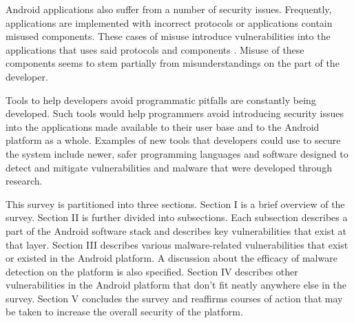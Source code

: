 Android applications also suffer from a number of security issues.
Frequently, applications are implemented with incorrect protocols or applications contain misused components.
These cases of misuse introduce vulnerabilities into the applications that uses said protocols and components \cite{Qin2020, Zhan2021, Maalouf2021}.
Misuse of these components seems to stem partially from misunderstandings on the part of the developer.

Tools to help developers avoid programmatic pitfalls are constantly being developed.
Such tools would help programmers avoid introducing security issues into the applications made available to their user base and to the Android platform as a whole.
Examples of new tools that developers could use to secure the system include newer, safer programming languages and software designed to detect and mitigate vulnerabilities and malware that were developed through research.

This survey is partitioned into three sections.
Section I is a brief overview of the survey.
Section II is further divided into subsections.
Each subsection describes a part of the Android software stack and describes key vulnerabilities that exist at that layer.
Section III describes various malware-related vulnerabilities that exist or existed in the Android platform.
A discussion about the efficacy of malware detection on the platform is also specified.
Section IV describes other vulnerabilities in the Android platform that don't fit neatly anywhere else in the survey.
Section V concludes the survey and reaffirms courses of action that may be taken to increase the overall security of the platform.
